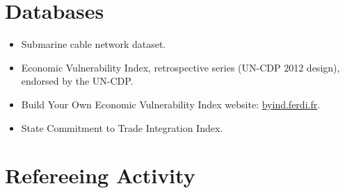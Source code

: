 \documentclass[11pt, a4paper]{article}
\begin{document}
\section{Databases}

\begin{itemize}
  \item Submarine cable network dataset.
  \item Economic Vulnerability Index, retrospective series (UN-CDP 2012 design), endorsed by the UN-CDP.
  \item Build Your Own Economic Vulnerability Index website: \href{http://byind.ferdi.fr/}{byind.ferdi.fr}.
  \item State Commitment to Trade Integration Index.
\end{itemize}

\section{Refereeing Activity}
\end{document}
